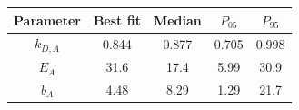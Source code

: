 \begin{tabular}{ccccc}
\toprule
Parameter & Best fit & Median & $P_{05}$ & $P_{95}$\\
\midrule
$k_{D,A}$ & 0.844 & 0.877 & 0.705 & 0.998\\
$E_{A}$ & 31.6 & 17.4 & 5.99 & 30.9\\
$b_A$ & 4.48 & 8.29 & 1.29 & 21.7\\
\bottomrule
\end{tabular}
